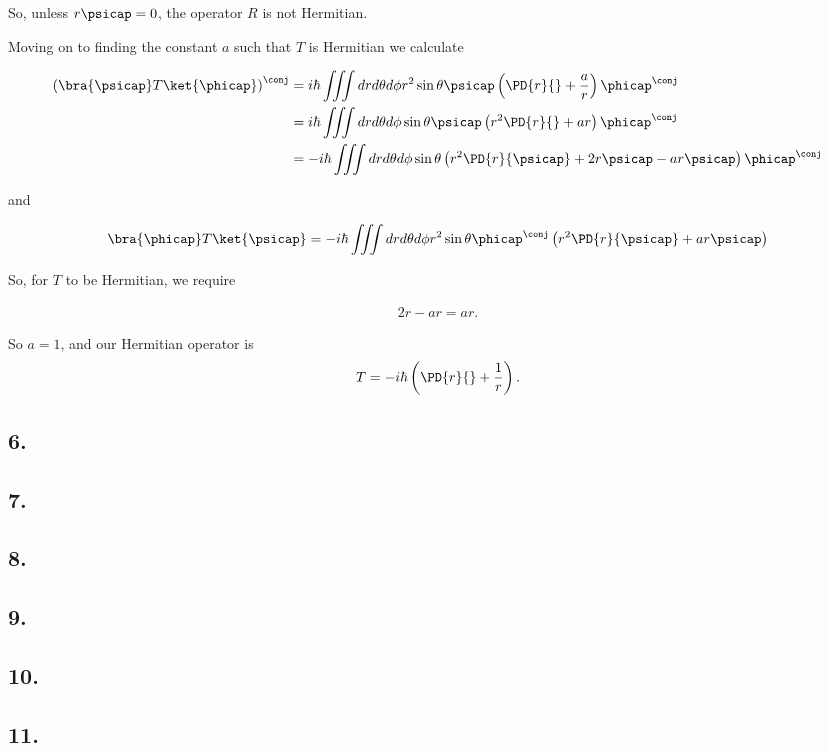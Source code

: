 So, unless $r\psicap = 0$, the operator $R$ is not Hermitian.

Moving on to finding the constant $a$ such that $T$ is Hermitian we calculate

\begin{align*}
\left( \bra{\psicap} T \ket{\phicap} \right)^\conj
&= i \hbar \iiint dr d\theta d\phi r^2 \sin\theta \psicap \left( \PD{r}{} + \frac{a}{r} \right) \phicap^\conj \\
&= i \hbar \iiint dr d\theta d\phi \sin\theta \psicap \left( r^2 \PD{r}{} + a r \right) \phicap^\conj \\
&= -i \hbar \iiint dr d\theta d\phi \sin\theta \left( r^2 \PD{r}{\psicap} + 2 r \psicap - a r \psicap \right) \phicap^\conj \\
\end{align*}

and

\begin{align*}
\bra{\phicap} T \ket{\psicap} 
= -i \hbar \iiint dr d\theta d\phi r^2 \sin\theta \phicap^\conj \left( r^2 \PD{r}{\psicap} + a r \psicap \right)
\end{align*}

So, for $T$ to be Hermitian, we require

\begin{align*}
2 r - a r = a r.
\end{align*}

So $a = 1$, and our Hermitian operator is
\begin{align*}
T = -i \hbar \left( \PD{r}{} + \frac{1}{r} \right).
\end{align*}

\subsection{6.}
\subsection{7.}
\subsection{8.}
\subsection{9.}
\subsection{10.}
\subsection{11.}

\EndArticle

